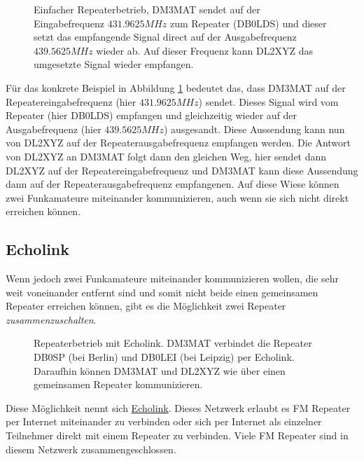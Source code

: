 \begin{figure}[!ht]
 \centering
 
 
 \caption{Einfacher Repeaterbetrieb, DM3MAT sendet auf der Eingabefrequenz $431.9625 MHz$ zum Repeater (DB0LDS) und dieser setzt das empfangende Signal direct auf der Ausgabefrequenz $439.5625 MHz$ wieder ab. Auf dieser Frequenz kann DL2XYZ das umgesetzte Signal wieder empfangen.} \label{fig:basicrepeater}
\end{figure}

Für das konkrete Beispiel in Abbildung \ref{fig:basicrepeater} bedeutet das, dass DM3MAT auf der Repeatereingabefrequenz (hier $431.9625 MHz$) sendet. Dieses Signal wird vom Repeater (hier DB0LDS) empfangen und gleichzeitig wieder auf der Ausgabefrequenz (hier $439.5625 MHz$) ausgesandt. Diese Aussendung kann nun von DL2XYZ auf der Repeaterausgabefrequenz empfangen werden. Die Antwort von DL2XYZ an DM3MAT folgt dann den gleichen Weg, hier sendet dann DL2XYZ auf der Repeatereingabefrequenz und DM3MAT kann diese Aussendung dann auf der Repeaterausgabefrequenz empfangenen. Auf diese Wiese können zwei Funkamateure miteinander kommunizieren, auch wenn sie sich nicht direkt erreichen können. 

\subsection{Echolink} \label{sec:echolink} 
Wenn jedoch zwei Funkamateure miteinander kommunizieren wollen, die sehr weit voneinander entfernt sind und somit nicht beide einen gemeinsamen Repeater erreichen können, gibt es die Möglichkeit zwei Repeater \emph{zusammenzuschalten}. 

\begin{figure}[!ht]
 \centering
 
 
 
 \caption{Repeaterbetrieb mit Echolink. DM3MAT verbindet die Repeater DB0SP (bei Berlin) und DB0LEI (bei Leipzig) per Echolink. Daraufhin können DM3MAT und DL2XYZ wie über einen gemeinsamen Repeater kommunizieren.} \label{fig:echolink}
\end{figure}

Diese Möglichkeit nennt sich \href{http://www.echolink.org/}{Echolink}. Dieses Netzwerk erlaubt es FM Repeater per Internet miteinander zu verbinden oder sich per Internet als einzelner Teilnehmer direkt mit einem Repeater zu verbinden. Viele FM Repeater sind in diesem Netzwerk zusammengeschlossen. 

